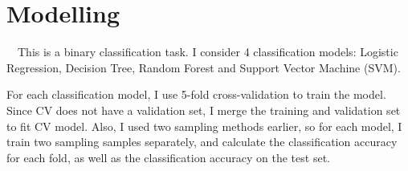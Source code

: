 \documentclass[11pt]{article}
\begin{document}
\section{Modelling}

\quad\ \ This is a binary classification task. I consider 4 classification models: Logistic Regression, Decision Tree, Random Forest and Support Vector Machine (SVM). 

For each classification model, I use 5-fold cross-validation to train the model. Since CV does not have a validation set, I merge the training and validation set to fit CV model. Also, I used two sampling methods earlier, so for each model, I train two sampling samples separately, and calculate the classification accuracy for each fold, as well as the classification accuracy on the test set.
\bigskip
\end{document}
